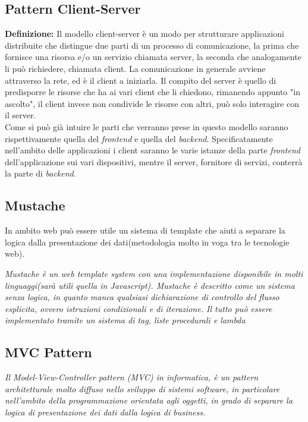 \subsection{Pattern Client-Server}
\textbf{Definizione:} Il modello client-server è un modo per strutturare applicazioni distribuite che distingue due parti di un processo di comunicazione, la prima che fornisce una risorsa e/o un servizio chiamata server, la seconda che analogamente li può richiedere, chiamata client. La comunicazione in generale avviene attraverso la rete, ed è il client a iniziarla. Il compito del server è quello di predisporre le risorse che ha ai vari client che li chiedono, rimanendo appunto "in ascolto", il client invece non condivide le risorse con altri, può solo interagire con il server\cite{wiki:cliserv}.\\

Come si può già intuire le parti che verranno prese in questo modello saranno rispettivamente quella del \emph{frontend} e quella del \emph{backend}. Specificatamente nell'ambito delle applicazioni i client saranno le varie istanze della parte \emph{frontend} dell'applicazione sui vari dispositivi, mentre il server, fornitore di servizi, conterrà la parte di \emph{backend}.

\subsection{Mustache}

In ambito web può essere utile un sistema di template che aiuti a separare la logica dalla presentazione dei dati(metodologia molto in voga tra le tecnologie web).

\emph{Mustache è un web template system con una implementazione disponibile in molti linguaggi(sarà utili quella in Javascript). Mustache è descritto come un sistema senza logica, in quanto manca qualsiasi dichiarazione di controllo del flusso esplicita, ovvero istruzioni condizionali e di iterazione. Il tutto può essere implementato tramite un sistema di tag, liste procedurali e lambda}
\hspace*{\fill}\cite{wiki:mustache}

\subsection{MVC Pattern}
\emph{Il Model-View-Controller pattern (MVC) in informatica, è un pattern architetturale molto diffuso nello sviluppo di sistemi software, in particolare nell'ambito della programmazione orientata agli oggetti, in grado di separare la logica di presentazione dei dati dalla logica di business.}

